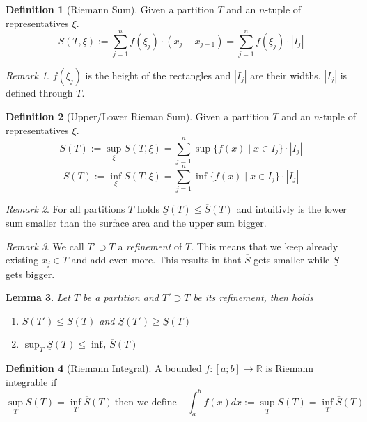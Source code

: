 \documentclass[english,titlepage]{uzhpub}
\theoremstyle{definition}
\newtheorem{definition}{Definition}[section]
\theoremstyle{plain}
\newtheorem{lemma}[definition]{Lemma}
\theoremstyle{remark}
\newtheorem*{remark}{Remark}
\theoremstyle{example}
\begin{document}
   \begin{definition}[Riemann Sum]
      Given a partition \(T\) and an \(n\)-tuple of representatives \(\xi\).
      \[S(T, \xi) := \sum_{j=1}^n f(\xi_j) \cdot (x_j - x_{j-1}) = \sum_{j=1}^n f(\xi_j) \cdot |I_j|\]
   \end{definition}
   \begin{remark}
      \(f(\xi_j)\) is the height of the rectangles and \(|I_j|\) are their widths.
      \(|I_j|\) is defined through \(T\).
   \end{remark}

   \begin{definition}[Upper/Lower Rieman Sum]
      Given a partition \(T\) and an \(n\)-tuple of representatives \(\xi\).
      \[\overline{S}(T) := \sup_{\xi} S(T, \xi) = \sum_{j=1}^n \sup\{f(x) \mid x \in I_j\} \cdot |I_j|\]
      \[\underline{S}(T) := \inf_{\xi} S(T, \xi) = \sum_{j=1}^n \inf\{f(x) \mid x \in I_j\} \cdot |I_j|\]
   \end{definition}
   \begin{remark}
      For all partitions \(T\) holds \(\underline{S}(T) \leq \overline{S}(T)\) and intuitivly is the lower sum smaller than the surface area and the upper sum bigger.
   \end{remark}

   \begin{center}
      
   \end{center}

   \begin{remark}
      We call \(T' \supset T\) a \textit{refinement} of \(T\).
      This means that we keep already existing \(x_j \in T\) and add even more.
      This results in that \(\overline{S}\) gets smaller while \(\underline{S}\) gets bigger.
   \end{remark}
   \begin{lemma}\label{lem:refinement_of_partition}
      Let \(T\) be a partition and \(T' \supset T\) be its refinement, then holds
      \begin{enumerate}[label=\roman*, align=Center]
         \item \(\overline{S}(T') \leq \overline{S}(T)\) and \(\underline{S}(T') \geq \underline{S}(T)\)
         \item \(\sup_T \underline{S}(T) \leq \inf_T \overline{S}(T)\)
      \end{enumerate}
   \end{lemma}

   \begin{definition}[Riemann Integral]
      A bounded \(f: [a; b] \to \mathbb{R}\) is Riemann integrable if
      \[\sup_{T}\underline{S}(T) = \inf_{T}\overline{S}(T)~\text{then we define}\quad \int_a^b f(x) dx := \sup_{T}\underline{S}(T) = \inf_{T}\overline{S}(T)\]
   \end{definition}
\end{document}
